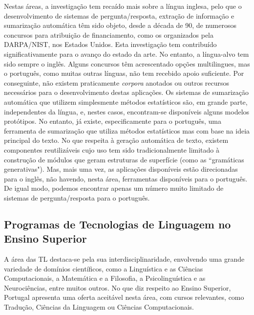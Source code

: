 \begin{multicols}{2}
Nestas áreas, a investigação tem recaído mais sobre a língua inglesa, pelo que o desenvolvimento de sistemas de pergunta/resposta, extração de informação e sumarização automática têm sido objeto, desde a década de 90, de numerosos concursos para atribuição de financiamento, como os organizados pela DARPA/NIST, nos Estados Unidos. Esta investigação tem contribuído significativamente para o avanço do estado da arte. No entanto, a língua-alvo tem sido sempre o inglês. Alguns concursos têm acrescentado opções multilingues, mas o português, como muitas outras línguas, não tem recebido apoio suficiente. Por conseguinte, não existem praticamente \textit{corpora} anotados ou outros recursos necessários para o desenvolvimento destas aplicações. Os sistemas de sumarização automática que utilizem simplesmente métodos estatísticos são, em grande parte, independentes da língua, e, nestes casos, encontram-se disponíveis alguns modelos protótipos. No entanto, já existe, especificamente para o português, uma ferramenta de sumarização que utiliza métodos estatísticos mas com base na ideia principal do texto. No que respeita à geração automática de texto, existem componentes reutilizáveis cujo uso tem sido tradicionalmente limitado à construção de módulos que geram estruturas de superfície (como as “gramáticas generativas"). Mas, mais uma vez, as aplicações disponíveis estão direcionadas para o inglês, não havendo, nesta área, ferramentas disponíveis para o português. De igual modo, podemos encontrar apenas um número muito limitado de sistemas de pergunta/resposta para o português.

\subsection{Programas de Tecnologias de Linguagem no Ensino Superior}

A área das TL destaca-se pela sua interdisciplinaridade, envolvendo uma grande variedade de domínios científicos, como a Linguística e as Ciências Computacionais, a Matemática e a Filosofia, a Psicolinguística e as Neurociências, entre muitos outros. No que diz respeito ao Ensino Superior, Portugal apresenta uma oferta aceitável nesta área, com cursos relevantes, como Tradução, Ciências da Linguagem ou Ciências Computacionais.


\end{multicols}
